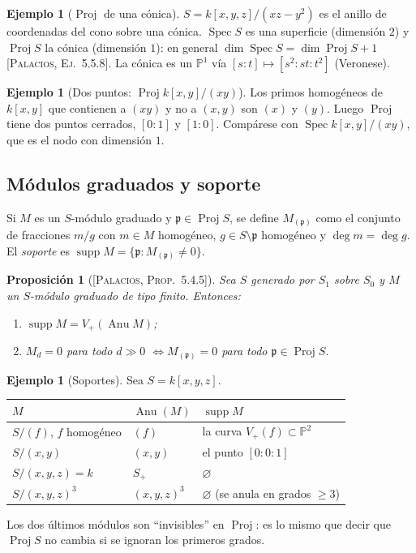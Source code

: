 \documentclass[11pt,a4paper]{article}
\newcommand{\Spec}{\operatorname{Spec}}
\newcommand{\Proj}{\operatorname{Proj}}
\newcommand{\Anu}{\operatorname{Anu}}
\newcommand{\PP}{\mathbb{P}}
\newcommand{\pp}{\mathfrak{p}}
\theoremstyle{plain}
\newtheorem{proposicion}[teorema]{Proposición}
\theoremstyle{definition}
\newtheorem{ejemplo}[teorema]{Ejemplo}
\theoremstyle{remark}
\newcounter{ej}
\newcommand{\libro}[1]{\textsc{[Palacios, #1]}}
\begin{document}
\begin{ejemplo}[{$\Proj$ de una cónica}]
$S=k[x,y,z]/(xz-y^2)$ es el anillo de coordenadas del cono sobre una cónica. $\Spec S$ es una superficie (dimensión $2$) y $\Proj S$ la cónica (dimensión $1$): en general $\dim\Spec S=\dim\Proj S+1$ \libro{Ej.~5.5.8}. La cónica es un $\PP^1$ vía $[s:t]\mapsto[s^2:st:t^2]$ (Veronese).
\end{ejemplo}

\begin{ejemplo}[{Dos puntos: $\Proj k[x,y]/(xy)$}]
Los primos homogéneos de $k[x,y]$ que contienen a $(xy)$ y no a $(x,y)$ son $(x)$ y $(y)$. Luego $\Proj$ tiene dos puntos cerrados, $[0:1]$ y $[1:0]$. Compárese con $\Spec k[x,y]/(xy)$, que es el nodo con dimensión $1$.
\end{ejemplo}

\subsection{Módulos graduados y soporte}

Si $M$ es un $S$-módulo graduado y $\pp\in\Proj S$, se define $M_{(\pp)}$ como el conjunto de fracciones $m/g$ con $m\in M$ homogéneo, $g\in S\setminus\pp$ homogéneo y $\deg m=\deg g$. El \emph{soporte} es $\operatorname{supp}M=\{\pp:M_{(\pp)}\ne0\}$.

\begin{proposicion}[{\libro{Prop.~5.4.5}}]
Sea $S$ generado por $S_1$ sobre $S_0$ y $M$ un $S$-módulo graduado de tipo finito. Entonces:
\begin{enumerate}[label=(\alph*),itemsep=1pt]
\item $\operatorname{supp}M=V_+(\Anu M)$;
\item $M_d=0$ para todo $d\gg0$ $\iff M_{(\pp)}=0$ para todo $\pp\in\Proj S$.
\end{enumerate}
\end{proposicion}

\begin{ejemplo}[{Soportes}]\label{ej:soporte}
Sea $S=k[x,y,z]$.
\begin{center}
\begin{tabular}{@{}lll@{}}
\toprule
$M$ & $\Anu(M)$ & $\operatorname{supp}M$ \\
\midrule
$S/(f)$, $f$ homogéneo & $(f)$ & la curva $V_+(f)\subset\PP^2$ \\
$S/(x,y)$ & $(x,y)$ & el punto $[0:0:1]$ \\
$S/(x,y,z)=k$ & $S_+$ & $\varnothing$ \\
$S/(x,y,z)^3$ & $(x,y,z)^3$ & $\varnothing$ (se anula en grados $\ge3$) \\
\bottomrule
\end{tabular}
\end{center}
Los dos últimos módulos son ``invisibles'' en $\Proj$: es lo mismo que decir que $\Proj S$ no cambia si se ignoran los primeros grados.
\end{ejemplo}
\end{document}
